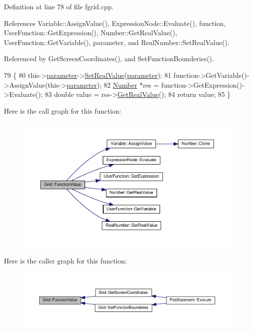Definition at line 78 of file fgrid.\+cpp.



References Variable\+::\+Assign\+Value(), Expression\+Node\+::\+Evaluate(), function, User\+Function\+::\+Get\+Expression(), Number\+::\+Get\+Real\+Value(), User\+Function\+::\+Get\+Variable(), parameter, and Real\+Number\+::\+Set\+Real\+Value().



Referenced by Get\+Screen\+Coordinates(), and Set\+Function\+Bounderies().


\begin{DoxyCode}
79 \{
80     this->\hyperlink{classGrid_a37df3261f985852f871847769c8b833c}{parameter}->\hyperlink{structRealNumber_a47b13da91334faba56ece7292f3a8566}{SetRealValue}(\hyperlink{classGrid_a37df3261f985852f871847769c8b833c}{parameter});
81     \textcolor{keyword}{function}->GetVariable()->AssignValue(this->\hyperlink{classGrid_a37df3261f985852f871847769c8b833c}{parameter});
82     \hyperlink{structNumber}{Number} *res = \textcolor{keyword}{function}->GetExpression()->Evaluate();
83     \textcolor{keywordtype}{double} value = res->\hyperlink{structNumber_a83da654d465f1344162ce8b8f8c564b9}{GetRealValue}();
84     \textcolor{keywordflow}{return} value;
85 \}
\end{DoxyCode}


Here is the call graph for this function\+:\nopagebreak
\begin{figure}[H]
\begin{center}
\leavevmode
\includegraphics[width=350pt]{classGrid_a9e403482f403a28e3a152b435526829b_cgraph}
\end{center}
\end{figure}




Here is the caller graph for this function\+:\nopagebreak
\begin{figure}[H]
\begin{center}
\leavevmode
\includegraphics[width=350pt]{classGrid_a9e403482f403a28e3a152b435526829b_icgraph}
\end{center}
\end{figure}


